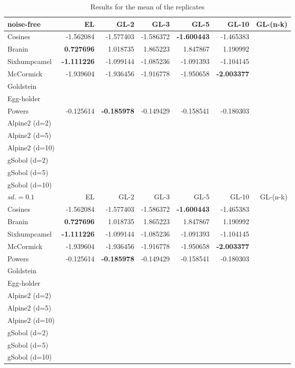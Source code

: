 \documentclass[twoside]{article}
\begin{document}
\begin{table*}[t!]
\begin{center}
\begin{tabular}{lrrrrrr}
\toprule
     noise-free &        EL &      GL-2 &      GL-3 &      GL-5 &     GL-10 & GL-(n-k) \\
\midrule
      Cosines & -1.562084 & -1.577403 & -1.586372 & \textbf{-1.600443} & -1.465383 &\\
       Branin &  \textbf{0.727696} &  1.018735 &  1.865223 &  1.847867 &  1.190992 & \\
 Sixhumpcamel & \textbf{-1.111226} & -1.099144 & -1.085236 & -1.091393 & -1.104145 & \\
    McCormick & -1.939604 & -1.936456 & -1.916778 & -1.950658 & \textbf{-2.003377} & \\
       Goldstein &&&&&\\
       Egg-holder &&&&&\\   
       Powers & -0.125614 & \textbf{-0.185978} & -0.149429 & -0.158541 & -0.180303 & \\
       Alpine2 (d=2) &&&&&\\
       Alpine2 (d=5) &&&&&\\
       Alpine2 (d=10) &&&&&\\
       gSobol (d=2) &&&&&\\
       gSobol (d=5) &&&&&\\
       gSobol (d=10) &&&&&\\
\bottomrule
\toprule
     $sd.=0.1 $ &        EL &      GL-2 &      GL-3 &      GL-5 &     GL-10 & GL-(n-k) \\
\midrule
      Cosines & -1.562084 & -1.577403 & -1.586372 & \textbf{-1.600443} & -1.465383 &\\
       Branin &  \textbf{0.727696} &  1.018735 &  1.865223 &  1.847867 &  1.190992 & \\
 Sixhumpcamel & \textbf{-1.111226} & -1.099144 & -1.085236 & -1.091393 & -1.104145 & \\
    McCormick & -1.939604 & -1.936456 & -1.916778 & -1.950658 & \textbf{-2.003377} & \\
       Powers & -0.125614 & \textbf{-0.185978} & -0.149429 & -0.158541 & -0.180303 & \\
              Goldstein &&&&&\\
       Egg-holder &&&&&\\   
       Alpine2 (d=2) &&&&&\\
       Alpine2 (d=5) &&&&&\\
       Alpine2 (d=10) &&&&&\\
       gSobol (d=2) &&&&&\\
       gSobol (d=5) &&&&&\\
       gSobol (d=10) &&&&&\\
\bottomrule
\end{tabular}\caption{Results for the mean of the replicates}
\end{center}
\end{table*}
\end{document}
